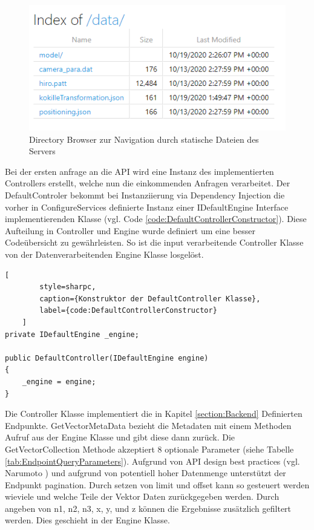 \begin{figure}
	\centering
	\includegraphics[width=0.7\linewidth]{images/backend/DirectoryBrowser}
	\caption{Directory Browser zur Navigation durch statische Dateien des Servers}
	\label{fig:DirectoryBrowser}
\end{figure}

Bei der ersten anfrage an die API wird eine Instanz des implementierten
Controllers erstellt, welche nun die einkommenden Anfragen verarbeitet.
Der DefaultControler bekommt bei Instanziierung via Dependency Injection
die vorher in ConfigureServices definierte Instanz einer IDefaultEngine
Interface implementierenden Klasse
(vgl. Code \ref{code:DefaultControllerConstructor}).
Diese Aufteilung in Controller und Engine wurde definiert um eine besser
Codeübersicht zu gewährleisten. So ist die input verarbeitende Controller
Klasse von der Datenverarbeitenden Engine Klasse losgelöst.

\begin{codeblock}
	\begin{lstlisting}[
		style=sharpc,
		caption={Konstruktor der DefaultController Klasse},
		label={code:DefaultControllerConstructor}
	]
private IDefaultEngine _engine;

public DefaultController(IDefaultEngine engine)
{
	_engine = engine;
}
	\end{lstlisting}
\end{codeblock}

Die Controller Klasse implementiert die in Kapitel \ref{section:Backend}
Definierten Endpunkte. GetVectorMetaData bezieht die Metadaten mit einem
Methoden Aufruf aus der Engine Klasse und gibt diese dann zurück.
Die GetVectorCollection Methode akzeptiert 8 optionale Parameter
(siehe Tabelle \ref{tab:EndpointQueryParameters}). Aufgrund von API
design best practices (vgl. Narumoto \cite{ApiDesignBestPractices})
und aufgrund von potentiell hoher Datenmenge unterstützt der Endpunkt
pagination. Durch setzen von limit und offset kann so gesteuert werden
wieviele und welche Teile der Vektor Daten zurückgegeben werden.
Durch angeben von n1, n2, n3, x, y, und z können die Ergebnisse
zusätzlich gefiltert werden. Dies geschieht in der Engine Klasse.

